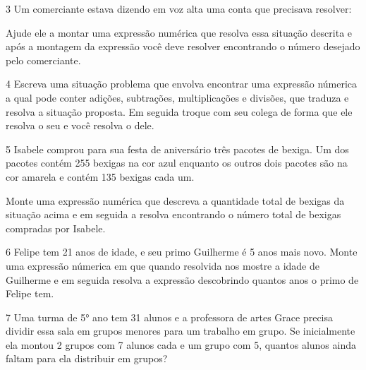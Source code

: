 

\num{3} Um comerciante estava dizendo em voz alta uma conta que precisava
resolver:


Ajude ele a montar uma expressão numérica que resolva essa situação
descrita e após a montagem da expressão você deve resolver encontrando o
número desejado pelo comerciante.



\num{4} Escreva uma situação problema que envolva encontrar uma expressão
númerica a qual pode conter adições, subtrações, multiplicações e
divisões, que traduza e resolva a situação proposta. Em seguida troque
com seu colega de forma que ele resolva o seu e você resolva o dele.



\num{5} Isabele comprou para sua festa de aniversário três pacotes de
bexiga. Um dos pacotes contém 255 bexigas na cor azul enquanto os outros
dois pacotes são na cor amarela e contém 135 bexigas cada um.

Monte uma expressão numérica que descreva a quantidade total de bexigas
da situação acima e em seguida a resolva encontrando o número total de
bexigas compradas por Isabele.



\num{6} Felipe tem 21 anos de idade, e seu primo Guilherme é 5 anos mais
novo. Monte uma expressão númerica em que quando resolvida nos mostre a
idade de Guilherme e em seguida resolva a expressão descobrindo quantos
anos o primo de Felipe tem.



\num{7} Uma turma de 5° ano tem 31 alunos e a professora de artes Grace
precisa dividir essa sala em grupos menores para um trabalho em grupo.
Se inicialmente ela montou 2 grupos com 7 alunos cada e um grupo com 5,
quantos alunos ainda faltam para ela distribuir em grupos?


